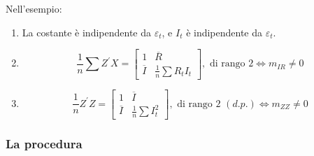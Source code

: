 \documentclass[a4paper]{report}
\newcounter{ese}
\theoremstyle{remark}
\begin{document}
\noindent Nell'esempio:

\begin{enumerate}
\item La costante \`{e} indipendente da $\varepsilon _{t}$, e $I_{t}$ \`{e}
indipendente da $\varepsilon _{t}$.

\item 
\begin{equation*}
\frac{1}{n}\sum {Z^{\prime }X}=\left[ 
\begin{array}{cc}
1 & \overline{R} \\ 
\overline{I} & \frac{1}{n}\sum R_{t}I_{t}%
\end{array}%
\right] ,\text{ di rango 2}\Longleftrightarrow m_{IR}\neq 0
\end{equation*}

\item 
\begin{equation*}
\frac{1}{n}Z^{\prime }Z=\left[ 
\begin{array}{cc}
1 & \overline{I} \\ 
\overline{I} & \frac{1}{n}\sum I_{t}^{2}%
\end{array}%
\right] ,\text{ di rango 2 }(d.p.)\Longleftrightarrow m_{ZZ}\neq 0
\end{equation*}
\end{enumerate}

\subsubsection{La procedura}
\end{document}
